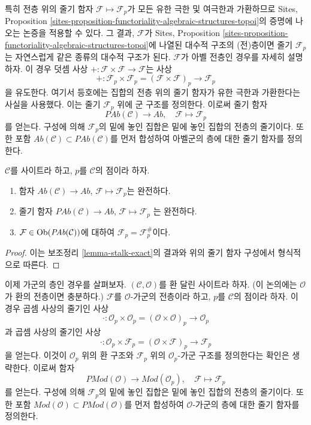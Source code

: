 \noindent
특히 전층 위의 줄기 함자 $\mathcal{F} \mapsto \mathcal{F}_p$가 모든 유한
극한 및 여극한과 가환하므로 Sites, Proposition
\ref{sites-proposition-functoriality-algebraic-structures-topoi}의 증명에
나오는 논증을 적용할 수 있다. 그 결과, $\mathcal{F}$가 Sites,
Proposition \ref{sites-proposition-functoriality-algebraic-structures-topoi}에
나열된 대수적 구조의 (전)층이면 줄기 $\mathcal{F}_p$는 자연스럽게 같은
종류의 대수적 구조가 된다. $\mathcal{F}$가 아벨 전층인 경우를 자세히
설명하자. 이 경우 덧셈 사상
$+ : \mathcal{F} \times \mathcal{F} \to \mathcal{F}$는 사상
$$
+ :
\mathcal{F}_p \times \mathcal{F}_p
=
(\mathcal{F} \times \mathcal{F})_p
\longrightarrow
\mathcal{F}_p
$$
을 유도한다. 여기서 등호에는 집합의 전층 위의 줄기 함자가 유한 극한과
가환한다는 사실을 사용했다. 이는 줄기 $\mathcal{F}_p$ 위에 군 구조를
정의한다. 이로써 줄기 함자
$$
\textit{PAb}(\mathcal{C}) \longrightarrow \textit{Ab}, \quad
\mathcal{F} \longmapsto \mathcal{F}_p
$$
를 얻는다. 구성에 의해 $\mathcal{F}_p$의 밑에 놓인 집합은 밑에 놓인
집합의 전층의 줄기이다. 또한 포함
$\textit{Ab}(\mathcal{C}) \subset \textit{PAb}(\mathcal{C})$를 먼저
합성하여 아벨군의 층에 대한 줄기 함자를 정의한다.

\begin{lemma}
\label{lemma-stalk-exact-abelian}
$\mathcal{C}$를 사이트라 하고, $p$를 $\mathcal{C}$의 점이라 하자.
\begin{enumerate}
\item 함자
$\textit{Ab}(\mathcal{C}) \to \textit{Ab}$,
$\mathcal{F} \mapsto \mathcal{F}_p$는 완전하다.
\item 줄기 함자
$\textit{PAb}(\mathcal{C}) \to \textit{Ab}$,
$\mathcal{F}  \mapsto  \mathcal{F}_p$
는 완전하다.
\item $\mathcal{F} \in \mathop{\mathrm{Ob}}\nolimits(\textit{PAb}(\mathcal{C}))$에 대하여
$\mathcal{F}_p = \mathcal{F}^\#_p$이다.
\end{enumerate}
\end{lemma}

\begin{proof}
이는 보조정리 \ref{lemma-stalk-exact}의 결과와 위의 줄기 함자 구성에서
형식적으로 따른다.
\end{proof}

\noindent
이제 가군의 층인 경우를 살펴보자.
$(\mathcal{C}, \mathcal{O})$를 환 달린 사이트라 하자.
(이 논의에는 $\mathcal{O}$가 환의 전층이면 충분하다.)
$\mathcal{F}$를 $\mathcal{O}$-가군의 전층이라 하고, $p$를
$\mathcal{C}$의 점이라 하자. 이 경우 곱셈 사상의 줄기인 사상
$$
\cdot :
\mathcal{O}_p \times \mathcal{O}_p
=
(\mathcal{O} \times \mathcal{O})_p
\longrightarrow
\mathcal{O}_p
$$
과 곱셈 사상의 줄기인 사상
$$
\cdot :
\mathcal{O}_p \times \mathcal{F}_p
=
(\mathcal{O} \times \mathcal{F})_p
\longrightarrow
\mathcal{F}_p
$$
을 얻는다. 이것이 $\mathcal{O}_p$ 위의 환 구조와 $\mathcal{F}_p$ 위의
$\mathcal{O}_p$-가군 구조를 정의한다는 확인은 생략한다.
이로써 함자
$$
\textit{PMod}(\mathcal{O}) \longrightarrow \textit{Mod}(\mathcal{O}_p), \quad
\mathcal{F} \longmapsto \mathcal{F}_p
$$
를 얻는다. 구성에 의해 $\mathcal{F}_p$의 밑에 놓인 집합은 밑에 놓인
집합의 전층의 줄기이다. 또한 포함
$\textit{Mod}(\mathcal{O}) \subset \textit{PMod}(\mathcal{O})$를 먼저
합성하여 $\mathcal{O}$-가군의 층에 대한 줄기 함자를 정의한다.

